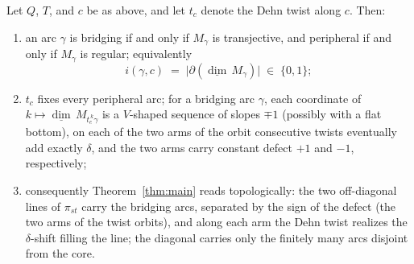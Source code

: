 \documentclass[10pt,a4paper]{amsart}
\begin{document}
\begin{proposition}
\label{prop:surface}
Let $Q$, $T$, and $c$ be as above, and let $t_c$ denote the Dehn twist
along $c$. Then:
\begin{enumerate}[label=\textup{(\arabic*)}]
\item an arc $\gamma$ is bridging if and only if $M_\gamma$ is
  transjective, and peripheral if and only if $M_\gamma$ is regular;
  equivalently
  \[
    i(\gamma, c) \;=\; \bigl|\partial(\underline{\dim}\, M_\gamma)\bigr|
    \;\in\; \{0, 1\};
  \]
\item $t_c$ fixes every peripheral arc; for a bridging arc $\gamma$, each
  coordinate of $k \mapsto \underline{\dim}\, M_{t_c^{\,k}\gamma}$ is a
  $V$-shaped sequence of slopes $\mp 1$ \textup{(}possibly with a flat
  bottom\textup{)}, on each of the two arms of the orbit consecutive
  twists eventually add exactly $\delta$, and the two arms carry constant
  defect $+1$ and $-1$, respectively;
\item consequently Theorem~\ref{thm:main} reads topologically: the two
  off-diagonal lines of $\pi_{st}$ carry the bridging arcs, separated by
  the sign of the defect \textup{(}the two arms of the twist
  orbits\textup{)}, and along each arm the Dehn twist realizes the
  $\delta$-shift filling the line; the diagonal carries only the finitely
  many arcs disjoint from the core.
\end{enumerate}
\end{proposition}
\end{document}
